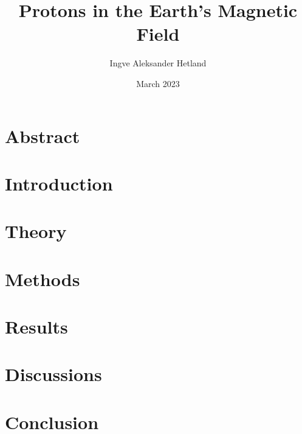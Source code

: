 \documentclass{article}
\title{Protons in the Earth's Magnetic Field}
\author{Ingve Aleksander Hetland}
\date{March 2023}
\begin{document}
\maketitle

\section{Abstract}


\section{Introduction}


\section{Theory}


\section{Methods}


\section{Results}


\section{Discussions}


\section{Conclusion}

\end{document}
